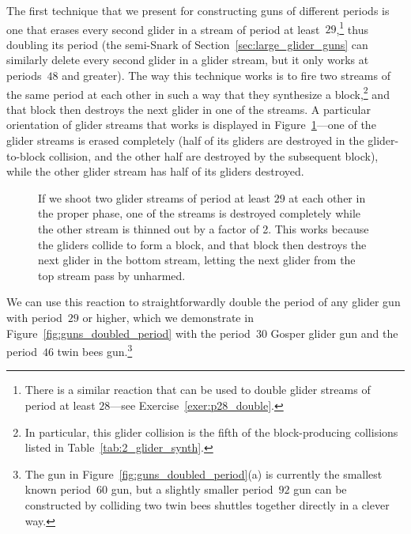 The first technique that we present for constructing guns of different periods is one that erases every second glider in a stream of period at least~$29$,\footnote{There is a similar reaction that can be used to double glider streams of period at least $28$---see Exercise~\ref{exer:p28_double}.} thus doubling its period (the semi-Snark of Section~\ref{sec:large_glider_guns} can similarly delete every second glider in a glider stream, but it only works at periods~$48$ and greater). The way this technique works is to fire two streams of the same period at each other in such a way that they synthesize a block,\footnote{In particular, this glider collision is the fifth of the block-producing collisions listed in Table~\ref{tab:2_glider_synth}.} and that block then destroys the next glider in one of the streams. A particular orientation of glider streams that works is displayed in Figure~\ref{fig:glider_delete}---one of the glider streams is erased completely (half of its gliders are destroyed in the glider-to-block collision, and the other half are destroyed by the subsequent block), while the other glider stream has half of its gliders destroyed.

\begin{figure}[!htb]
	\centering
	\caption{If we shoot two glider streams of period at least $29$ at each other in the proper phase, one of the streams is destroyed completely while the other stream is thinned out by a factor of 2. This works because the gliders collide to form a block, and that block then destroys the next glider in the bottom stream, letting the next glider from the top stream pass by unharmed.}\label{fig:glider_delete}
\end{figure}

We can use this reaction to straightforwardly double the period of any glider gun with period~$29$ or higher, which we demonstrate in Figure~\ref{fig:guns_doubled_period} with the period~$30$ Gosper glider gun and the period~$46$ twin bees gun.\footnote{The gun in Figure~\ref{fig:guns_doubled_period}(a) is currently the smallest known period~$60$ gun, but a slightly smaller period~$92$ gun can be constructed by colliding two twin bees shuttles together directly in a clever way.}

